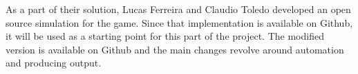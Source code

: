 \documentclass[runningheads,a4paper]{llncs}
\begin{document}








As a part of their solution, Lucas Ferreira and Claudio 
Toledo\cite{ferreira2014search} developed an open source simulation for the 
game. Since that implementation is available on Github\cite{sciencebirds}, it 
will be used as a starting point for this part of the project. The modified 
version is available on Github\cite{sciencebirds-adapt} and the main changes 
revolve around automation and producing output.
\end{document}
